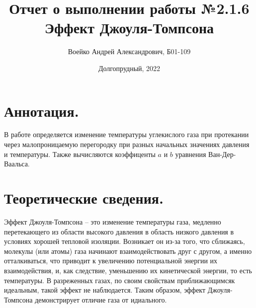 \documentclass[a4paper,11pt]{article}
\title{Отчет о выполнении работы №2.1.6\\Эффект Джоуля-Томпсона}
\author{Воейко Андрей Александрович, Б01-109}
\date{Долгопрудный, 2022}
\begin{document}
\maketitle
\newpage
\section{Аннотация.}
В работе определяется изменение температуры углекислого газа при протекании через малопроницаемую перегородку при разных начальных значениях давления и температуры. Также вычисляются коэффиценты $a$ и $b$ уравнения Ван-Дер-Ваальса.
\section{Теоретические сведения.}
Эффект Джоуля-Томпсона -- это изменение температуры газа, медленно перетекающего из области высокого давления в область низкого давления в условиях хорошей тепловой изоляции. Возникает он из-за того, что сближаясь, молекулы (или атомы) газа начинают взаимодействовать друг с другом, а именно отталкиваться, что приводит к увеличению потенциальной энергии их взаимодействия, и, как следствие, уменьшению их кинетической энергии, то есть температуры. В разреженных газах, по своим свойствам приближающимсяк идеальным, такой эффект не наблюдается. Таким образом, эффект Джоуля-Томпсона демонстрирует отличие газа от идиального.
\end{document}
